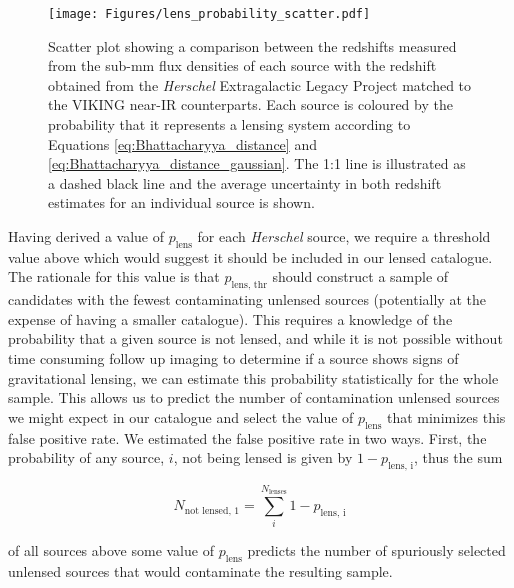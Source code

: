 \begin{figure}
    \centering
    \texttt{[image: Figures/lens\_probability\_scatter.pdf]}
    \caption{Scatter plot showing a comparison between the redshifts measured from the sub-mm flux densities of each source with the redshift obtained from the \textit{Herschel} Extragalactic Legacy Project matched to the VIKING near-IR counterparts. Each source is coloured by the probability that it represents a lensing system according to Equations \ref{eq:Bhattacharyya_distance} and \ref{eq:Bhattacharyya_distance_gaussian}. The 1:1 line is illustrated as a dashed black line and the average uncertainty in both redshift estimates for an individual source is shown.}
    \label{fig:lens_probability_scatter}
\end{figure}

Having derived a value of $p_{\textrm{lens}}$ for each \textit{Herschel} source, we require a threshold value above which would suggest it should be included in our lensed catalogue. The rationale for this value is that $p_{\textrm{lens, thr}}$ should construct a sample of candidates with the fewest contaminating unlensed sources (potentially at the expense of having a smaller catalogue). This requires a knowledge of the probability that a given source is not lensed, and while it is not possible without time consuming follow up imaging to determine if a source shows signs of gravitational lensing, we can estimate this probability statistically for the whole sample. This allows us to predict the number of contamination unlensed sources we might expect in our catalogue and select the value of $p_{\textrm{lens}}$ that minimizes this false positive rate. We estimated the false positive rate in two ways. First, the probability of any source, $i$, not being lensed is given by $1 - p_{\textrm{lens, i}}$, thus the sum

\begin{equation}
N_{\textrm{not lensed, 1}} = \sum_{i}^{N_{\textrm{lenses}}}{1 - p_{\textrm{lens, i}}}
\label{eq:unlensed_estimate_1}
\end{equation} 

of all sources above some value of $p_{\textrm{lens}}$ predicts the number of spuriously selected unlensed sources that would contaminate the resulting sample. 


